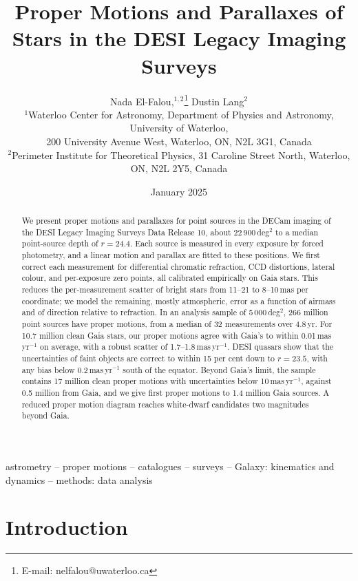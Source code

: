 \documentclass[usenatbib]{mnras}   %
\title[Proper Motions and Parallaxes in DESI Imaging]{Proper Motions and Parallaxes of Stars in the DESI Legacy Imaging Surveys}
\author[Nada El-Falou et al.]{
Nada El-Falou,$^{1, 2}$\thanks{E-mail: nelfalou@uwaterloo.ca}
Dustin Lang$^{2}$
\\
$^{1}$Waterloo Center for Astronomy, Department of Physics and Astronomy, University of Waterloo, \\
\hspace{0em} 200 University Avenue West, 
Waterloo, ON, N2L 3G1, Canada \\
$^{2}$Perimeter Institute for Theoretical Physics, 
31 Caroline Street North,
Waterloo, ON, N2L 2Y5, Canada \\
}
\date{January 2025}
\begin{document}
\label{firstpage}
\pagerange{\pageref{firstpage}--\pageref{lastpage}}
\maketitle

\begin{abstract}
We present proper motions and parallaxes for point sources in the DECam imaging of the DESI Legacy Imaging Surveys Data Release 10, about 22\,900\,deg$^2$ to a median point-source depth of $r = 24.4$. Each source is measured in every exposure by forced photometry, and a linear motion and parallax are fitted to these positions. We first correct each measurement for differential chromatic refraction, CCD distortions, lateral colour, and per-exposure zero points, all calibrated empirically on Gaia stars. This reduces the per-measurement scatter of bright stars from 11--21 to 8--10\,mas per coordinate; we model the remaining, mostly atmospheric, error as a function of airmass and of direction relative to refraction. In an analysis sample of 5\,000\,deg$^2$, 266 million point sources have proper motions, from a median of 32 measurements over 4.8\,yr. For 10.7 million clean Gaia stars, our proper motions agree with Gaia's to within 0.01\,mas\,yr$^{-1}$ on average, with a robust scatter of 1.7--1.8\,mas\,yr$^{-1}$. DESI quasars show that the uncertainties of faint objects are correct to within 15 per cent down to $r = 23.5$, with any bias below 0.2\,mas\,yr$^{-1}$ south of the equator. Beyond Gaia's limit, the sample contains 17 million clean proper motions with uncertainties below 10\,mas\,yr$^{-1}$, against 0.5 million from Gaia, and we give first proper motions to 1.4 million Gaia sources. A reduced proper motion diagram reaches white-dwarf candidates two magnitudes beyond Gaia.
\end{abstract}


\begin{keywords}
astrometry -- proper motions -- catalogues -- surveys -- Galaxy: kinematics and dynamics -- methods: data analysis
\end{keywords}


\section{Introduction}
\end{document}
